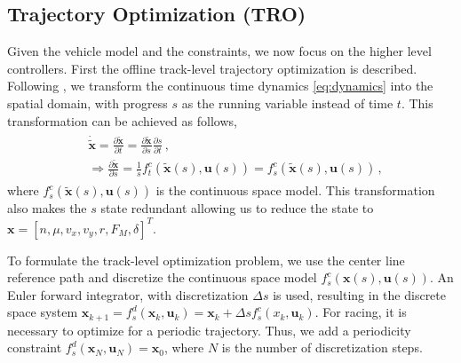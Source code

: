 
\subsection{Trajectory Optimization (TRO)}
\label{sec:traj_opt}

Given the vehicle model and the constraints, we now focus on the higher level controllers. First the offline track-level trajectory optimization is described. Following \cite{vazquez2020optimization}, we transform the continuous time dynamics \eqref{eq:dynamics} into the spatial domain, with progress $s$ as the running variable instead of time $t$. This transformation can be achieved as follows, 
\begin{align}
\label{eq:spatialdomain}
\begin{split}
&\mathbf{\dot{\tilde{x}}} = \frac{\partial \mathbf{\tilde{x}}}{\partial t} = \frac{\partial \mathbf{\tilde{x}}}{\partial s}\frac{\partial s}{\partial t}\,, \\
& \Rightarrow \frac{\partial \mathbf{\tilde{x}}}{\partial s} = \frac{1}{\dot{s}}f^c_t(\mathbf{\tilde{x}}(s),\mathbf{u}(s))  = f^c_s(\mathbf{\tilde{x}}(s),\mathbf{u}(s)) \,,
\end{split}
\end{align}
where $f^c_s(\mathbf{\tilde{x}}(s),\mathbf{u}(s))$ is the continuous space model. This transformation also makes the $s$ state redundant allowing us to reduce the state to $\mathbf{x} = [n,\mu,v_x,v_y,r,F_M,\delta]^T$.

To formulate the track-level optimization problem, we use the center line reference path and discretize the continuous space model $f^c_s(\mathbf{{x}}(s),\mathbf{u}(s))$. An Euler forward integrator, with discretization $\Delta s$ is used, resulting in the discrete space system $\mathbf{{x}}_{k+1} = f_s^d(\mathbf{{x}}_k, \mathbf{u}_k) = \mathbf{{x}}_k + \Delta s f_s^c({{x}}_k,\mathbf{u}_k)$.
For racing, it is necessary to optimize for a periodic trajectory. Thus, we add a periodicity constraint $f_s^d(\mathbf{{x}}_N, \mathbf{u}_N) = \mathbf{{x}}_{0} $, where $N$ is the number of discretization steps.

